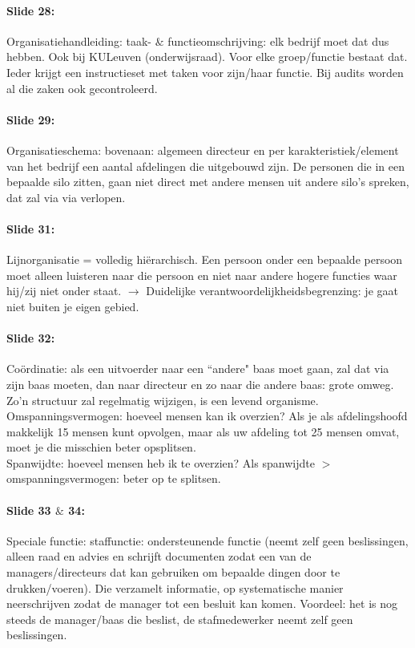 \documentclass[10pt,a4paper]{report}
\begin{document}
\paragraph{Slide 28:} Organisatiehandleiding: taak- $\&$ functieomschrijving: elk bedrijf moet dat dus hebben. Ook bij KULeuven (onderwijsraad). Voor elke groep/functie bestaat dat. Ieder krijgt een instructieset met taken voor zijn/haar functie. Bij audits worden al die zaken ook gecontroleerd.

\paragraph{Slide 29:} Organisatieschema: bovenaan: algemeen directeur en per karakteristiek/element van het bedrijf een aantal afdelingen die uitgebouwd zijn. De personen die in een bepaalde silo zitten, gaan niet direct met andere mensen uit andere silo's spreken, dat zal via via verlopen.

\paragraph{Slide 31:} Lijnorganisatie = volledig hi\"erarchisch. Een persoon onder een bepaalde persoon moet alleen luisteren naar die persoon en niet naar andere hogere functies waar hij/zij niet onder staat. $\rightarrow$ Duidelijke verantwoordelijkheidsbegrenzing: je gaat niet buiten je eigen gebied.

\paragraph{Slide 32:} Co\"ordinatie: als een uitvoerder naar een ``andere" baas moet gaan, zal dat via zijn baas moeten, dan naar directeur en zo naar die andere baas: grote omweg.
Zo'n structuur zal regelmatig wijzigen, is een levend organisme.\\
Omspanningsvermogen: hoeveel mensen kan ik overzien? Als je als afdelingshoofd makkelijk 15 mensen kunt opvolgen, maar als uw afdeling tot 25 mensen omvat, moet je die misschien beter opsplitsen.\\
Spanwijdte: hoeveel mensen heb ik te overzien? Als spanwijdte $>$ omspanningsvermogen: beter op te splitsen.

\paragraph{Slide 33 $\&$ 34:} Speciale functie: staffunctie: ondersteunende functie (neemt zelf geen beslissingen, alleen raad en advies en schrijft documenten zodat een van de managers/directeurs dat kan gebruiken om bepaalde dingen door te drukken/voeren). Die verzamelt informatie, op systematische manier neerschrijven zodat de manager tot een besluit kan komen. Voordeel: het is nog steeds de manager/baas die beslist, de stafmedewerker neemt zelf geen beslissingen.
\end{document}
